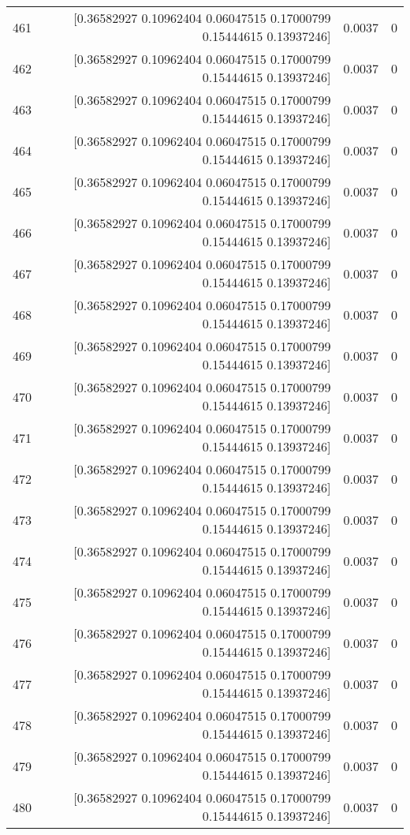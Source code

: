 \begin{longtable}{lrrr}
461 & [0.36582927 0.10962404 0.06047515 0.17000799 0.15444615 0.13937246] & 0.0037 & 0 \\
462 & [0.36582927 0.10962404 0.06047515 0.17000799 0.15444615 0.13937246] & 0.0037 & 0 \\
463 & [0.36582927 0.10962404 0.06047515 0.17000799 0.15444615 0.13937246] & 0.0037 & 0 \\
464 & [0.36582927 0.10962404 0.06047515 0.17000799 0.15444615 0.13937246] & 0.0037 & 0 \\
465 & [0.36582927 0.10962404 0.06047515 0.17000799 0.15444615 0.13937246] & 0.0037 & 0 \\
466 & [0.36582927 0.10962404 0.06047515 0.17000799 0.15444615 0.13937246] & 0.0037 & 0 \\
467 & [0.36582927 0.10962404 0.06047515 0.17000799 0.15444615 0.13937246] & 0.0037 & 0 \\
468 & [0.36582927 0.10962404 0.06047515 0.17000799 0.15444615 0.13937246] & 0.0037 & 0 \\
469 & [0.36582927 0.10962404 0.06047515 0.17000799 0.15444615 0.13937246] & 0.0037 & 0 \\
470 & [0.36582927 0.10962404 0.06047515 0.17000799 0.15444615 0.13937246] & 0.0037 & 0 \\
471 & [0.36582927 0.10962404 0.06047515 0.17000799 0.15444615 0.13937246] & 0.0037 & 0 \\
472 & [0.36582927 0.10962404 0.06047515 0.17000799 0.15444615 0.13937246] & 0.0037 & 0 \\
473 & [0.36582927 0.10962404 0.06047515 0.17000799 0.15444615 0.13937246] & 0.0037 & 0 \\
474 & [0.36582927 0.10962404 0.06047515 0.17000799 0.15444615 0.13937246] & 0.0037 & 0 \\
475 & [0.36582927 0.10962404 0.06047515 0.17000799 0.15444615 0.13937246] & 0.0037 & 0 \\
476 & [0.36582927 0.10962404 0.06047515 0.17000799 0.15444615 0.13937246] & 0.0037 & 0 \\
477 & [0.36582927 0.10962404 0.06047515 0.17000799 0.15444615 0.13937246] & 0.0037 & 0 \\
478 & [0.36582927 0.10962404 0.06047515 0.17000799 0.15444615 0.13937246] & 0.0037 & 0 \\
479 & [0.36582927 0.10962404 0.06047515 0.17000799 0.15444615 0.13937246] & 0.0037 & 0 \\
480 & [0.36582927 0.10962404 0.06047515 0.17000799 0.15444615 0.13937246] & 0.0037 & 0 \\

\end{longtable}

